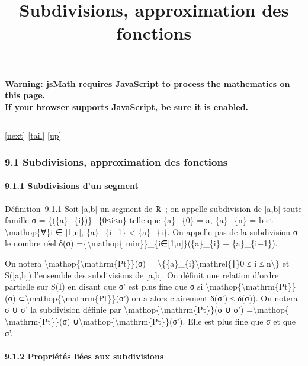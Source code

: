 \documentclass[]{article}
\title{Subdivisions, approximation des fonctions}
\author{}
\date{}
\begin{document}
\maketitle

\textbf{Warning: \href{http://www.math.union.edu/locate/jsMath}{jsMath}
requires JavaScript to process the mathematics on this page.\\ If your
browser supports JavaScript, be sure it is enabled.}

\begin{center}\rule{3in}{0.4pt}\end{center}

{[}\href{coursse51.html}{next}{]}
{[}\hyperref[tailcoursse50.html]{tail}{]}
{[}\href{coursch10.html\#coursse50.html}{up}{]}

\subsubsection{9.1 Subdivisions, approximation des fonctions}

\paragraph{9.1.1 Subdivisions d'un segment}

Définition~9.1.1 Soit {[}a,b{]} un segment de ℝ~; on appelle subdivision
de {[}a,b{]} toute famille σ = \{(\{a\}\_\{i\})\}\_\{0≤i≤n\} telle que
\{a\}\_\{0\} = a, \{a\}\_\{n\} = b et \textbackslash{}mathop\{∀\}i ∈
{[}1,n{]}, \{a\}\_\{i−1\} \textless{} \{a\}\_\{i\}. On appelle pas de la
subdivision σ le nombre réel δ(σ) =\{\textbackslash{}mathop\{
min\}\}\_\{i∈{[}1,n{]}\}(\{a\}\_\{i\} − \{a\}\_\{i−1\}).

On notera \textbackslash{}mathop\{\textbackslash{}mathrm\{Pt\}\}(σ) =
\textbackslash{}\{\{a\}\_\{i\}\textbackslash{}mathrel\{∣\}0 ≤ i ≤
n\textbackslash{}\} et S({[}a,b{]}) l'ensemble des subdivisions de
{[}a,b{]}. On définit une relation d'ordre partielle sur S(I) en disant
que σ' est plus fine que σ si
\textbackslash{}mathop\{\textbackslash{}mathrm\{Pt\}\}(σ)
⊂\textbackslash{}mathop\{\textbackslash{}mathrm\{Pt\}\}(σ') on a alors
clairement δ(σ') ≤ δ(σ)). On notera σ ∪ σ' la subdivision définie par
\textbackslash{}mathop\{\textbackslash{}mathrm\{Pt\}\}(σ ∪ σ')
=\textbackslash{}mathop\{ \textbackslash{}mathrm\{Pt\}\}(σ)
∪\textbackslash{}mathop\{\textbackslash{}mathrm\{Pt\}\}(σ'). Elle est
plus fine que σ et que σ'.

\paragraph{9.1.2 Propriétés liées aux subdivisions}
\end{document}
